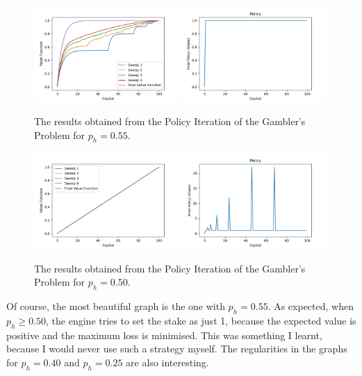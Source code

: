 \begin{figure}[h!]
    \centering
    \includegraphics[width=0.49\textwidth]{images/sweeps-0.55.png}
    \includegraphics[width=0.49\textwidth]{images/pi-0.55.png}
    \caption{The results obtained from the Policy Iteration of the Gambler's Problem for $p_h=0.55$.}
    \label{fig:gambler-0.55}
\end{figure}

\begin{figure}[h!]
    \centering
    \includegraphics[width=0.49\textwidth]{images/sweeps-0.5.png}
    \includegraphics[width=0.49\textwidth]{images/pi-0.5.png}
    \caption{The results obtained from the Policy Iteration of the Gambler's Problem for $p_h=0.50$.}
    \label{fig:gambler-0.50}
\end{figure}

Of course, the most beautiful graph is the one with $p_h=0.55$. As expected, when $p_h \geq 0.50$, the engine tries to set the stake as just 1, because the expected value is positive and the maximum loss is minimised. This was something I learnt, because I would never use such a strategy myself. The regularities in the graphs for $p_h=0.40$ and $p_h=0.25$ are also interesting.